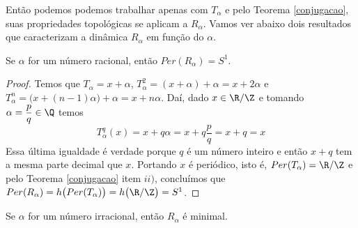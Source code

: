 Então podemos podemos trabalhar apenas com $T_{\alpha}$ e pelo Teorema \ref{conjugacao}, suas propriedades topológicas se aplicam a $R_{\alpha}$. Vamos ver abaixo dois resultados que caracterizam a dinâmica $R_{\alpha}$ em função do $\alpha$.

\begin{proposicao} Se $\alpha$ for um número racional, então $Per(R_{\alpha})=S^1$.
\end{proposicao}

\begin{proof} Temos que $T_{\alpha}=x+\alpha$, $T_{\alpha}^2=(x+\alpha)+\alpha=x+2\alpha$ e $T_{\alpha}^n=\big(x+(n-1)\alpha\big)+\alpha=x+n\alpha$. Daí, dado $x\in\R/\Z$ e tomando $\alpha=\dfrac{p}{q}\in\Q$ temos 
$$T_{\alpha}^q(x)=x+q\alpha=x+q\dfrac{p}{q}=x+q=x$$
Essa última igualdade é verdade porque $q$ é um número inteiro e então $x+q$ tem a mesma parte decimal que $x$. Portando $x$ é periódico, isto é, $Per(T_{\alpha})=\R/\Z$ e pelo Teorema \ref{conjugacao} item $ii)$, concluímos que $Per(R_{\alpha})=h\big(Per(T_{\alpha})\big)=h\big(\R/\Z\big)=S^1$.
\end{proof}

\begin{proposicao}\label{rotacaoirracional} Se $\alpha$ for um número irracional, então $R_{\alpha}$ é minimal.
\end{proposicao}

